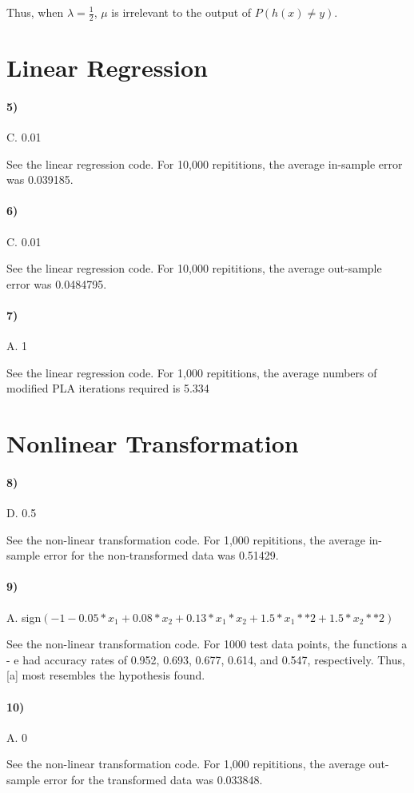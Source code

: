 \documentclass[10pt,letter]{article}
\begin{document}
	Thus, when $\lambda = \frac{1}{2}$, $\mu$ is irrelevant to the output of $P(h(x) \neq y)$.

\section*{Linear Regression}

\paragraph{5)} C. 0.01

	See the linear regression code. For 10,000 repititions, the average in-sample error was 0.039185. 

\paragraph{6)} C. 0.01

	See the linear regression code. For 10,000 repititions, the average out-sample error was 0.0484795.

\paragraph{7)} A. 1

	See the linear regression code. For 1,000 repititions, the average numbers of modified PLA iterations required is 5.334

\section*{Nonlinear Transformation}

\paragraph{8)} D. 0.5

	See the non-linear transformation code. For 1,000 repititions, the average in-sample error for the non-transformed data was 0.51429. 

\paragraph{9)} A. sign$(-1 - 0.05*x_1 + 0.08*x_2 + 0.13*x_1*x_2 + 1.5*x_1**2 + 1.5*x_2**2)$

	See the non-linear transformation code. For 1000 test data points, the functions a - e had accuracy rates of 0.952, 0.693, 0.677, 0.614, and 0.547, respectively. Thus, [a] most resembles the hypothesis found.

\paragraph{10)} A. 0

	See the non-linear transformation code. For 1,000 repititions, the average out-sample error for the transformed data was 0.033848.
\end{document}
